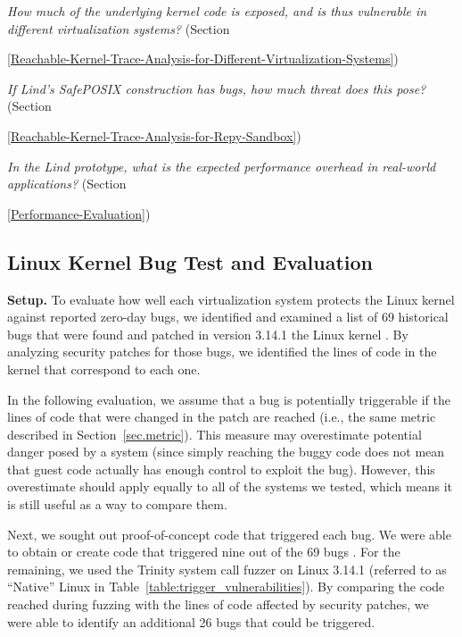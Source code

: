 \textit{How much of the underlying kernel code is exposed, and is thus
vulnerable in different virtualization systems?}
(Section~{{\ref{Reachable-Kernel-Trace-Analysis-for-Different-Virtualization-Systems}})

\textit{If Lind's SafePOSIX construction has bugs, how much threat does this pose?}
(Section~{{\ref{Reachable-Kernel-Trace-Analysis-for-Repy-Sandbox}})

\textit{In the Lind prototype, what is the expected performance overhead in
real-world applications?}
(Section~{{\ref{Performance-Evaluation}})

\subsection{Linux Kernel Bug Test and Evaluation}
\label{Linux-Kernel-Bug-Test-and-Evaluation}


\noindent
\textbf{Setup.}
To evaluate how well each virtualization system protects the Linux kernel
against reported zero-day bugs,
we identified and examined a list of 69 historical bugs that were found and patched in version 3.14.1 the Linux kernel \cite{CVE-Datasource}.
By analyzing security patches for those bugs,
we identified the lines of code in the kernel that correspond to each one.

In the following evaluation, we assume that a bug is potentially triggerable if the lines of code that were changed in the patch are reached 
(i.e., the same metric described in Section~\ref{sec.metric}).
This measure may overestimate potential danger posed by a system (since simply reaching the buggy code does not mean that guest code 
actually has enough control to exploit the bug).
However, this overestimate should apply equally to all of the systems we tested, which means it is still useful as a way to compare them.

Next, we sought out proof-of-concept code that triggered each bug. We were able to obtain or create code that triggered nine out of the 69 bugs \cite{Exploit-Database}.
For the remaining, we used the Trinity system call fuzzer \cite{Trinity} on Linux 3.14.1 (referred to as ``Native'' Linux in Table~\ref{table:trigger_vulnerabilities}).
By comparing the code reached during fuzzing with the lines of code affected by security patches, we were able to identify an additional 26 bugs that could be triggered.

}}}

